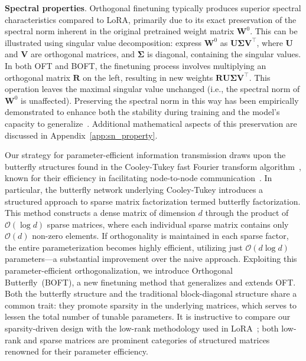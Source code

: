 \textbf{Spectral properties}. Orthogonal finetuning typically produces superior spectral characteristics compared to LoRA, primarily due to its exact preservation of the spectral norm inherent in the original pretrained weight matrix $\bm{W}^0$. This can be illustrated using singular value decomposition: express $\bm{W}^0$ as $\bm{U}\bm{\Sigma}\bm{V}^\top$, where $\bm{U}$ and $\bm{V}$ are orthogonal matrices, and $\bm{\Sigma}$ is diagonal, containing the singular values. In both OFT and BOFT, the finetuning process involves multiplying an orthogonal matrix $\bm{R}$ on the left, resulting in new weights $\bm{R}\bm{U}\bm{\Sigma}\bm{V}^\top$. This operation leaves the maximal singular value unchanged (i.e., the spectral norm of $\bm{W}^0$ is unaffected). Preserving the spectral norm in this way has been empirically demonstrated to enhance both the stability during training and the model’s capacity to generalize~\cite{miyato2018spectral,yoshida2017spectral}. Additional mathematical aspects of this preservation are discussed in Appendix~\ref{app:sn_property}.

Our strategy for parameter-efficient information transmission draws upon the butterfly structures found in the Cooley-Tukey fast Fourier transform algorithm~\cite{cooley1965algorithm}, known for their efficiency in facilitating node-to-node communication~\cite{klasing1994broadcasting}. In particular, the butterfly network underlying Cooley-Tukey introduces a structured approach to sparse matrix factorization termed butterfly factorization. This method constructs a dense matrix of dimension $d$ through the product of $\mathcal{O}(\log d)$ sparse matrices, where each individual sparse matrix contains only $\mathcal{O}(d)$ non-zero elements. If orthogonality is maintained in each sparse factor, the entire parameterization becomes highly efficient, utilizing just $\mathcal{O}(d\log d)$ parameters—a substantial improvement over the naive approach. Exploiting this parameter-efficient orthogonalization, we introduce Orthogonal Butterfly~(BOFT), a new finetuning method that generalizes and extends OFT. Both the butterfly structure and the traditional block-diagonal structure share a common trait: they promote sparsity in the underlying matrices, which serves to lessen the total number of tunable parameters. It is instructive to compare our sparsity-driven design with the low-rank methodology used in LoRA~\cite{hulora2022}; both low-rank and sparse matrices are prominent categories of structured matrices~\cite{candes2011robust} renowned for their parameter efficiency.

